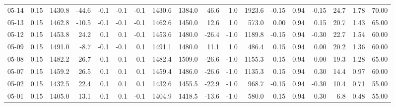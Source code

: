 \begin{threeparttable}
{\begin{tabular}{lrrrrrrrrrrrrrrrrr}
  05-14 &     0.15 & 1430.8 &             -44.6 &              -0.1 &               -0.1 &               -0.1 & 1430.6 & 1384.0 &       46.6 &                      1.0 &              1923.6 &      -0.15 &      0.94 &          -0.15 &             24.7 &            1.78 &                  70.00 \\
  05-13 &     0.15 & 1462.8 &             -10.5 &              -0.1 &               -0.1 &               -0.1 & 1462.6 & 1450.0 &       12.6 &                      1.0 &               573.0 &       0.00 &      0.94 &           0.15 &             20.7 &            1.43 &                  65.00 \\
  05-12 &     0.15 & 1453.8 &              24.2 &               0.1 &                0.1 &               -0.1 & 1453.6 & 1480.0 &      -26.4 &                     -1.0 &              1189.8 &      -0.15 &      0.94 &          -0.30 &             22.7 &            1.54 &                  60.00 \\
  05-09 &     0.15 & 1491.0 &              -8.7 &              -0.1 &               -0.1 &                0.1 & 1491.1 & 1480.0 &       11.1 &                      1.0 &               486.4 &       0.15 &      0.94 &           0.00 &             20.2 &            1.36 &                  60.00 \\
  05-08 &     0.15 & 1482.2 &              26.7 &               0.1 &                0.1 &                0.1 & 1482.4 & 1509.0 &      -26.6 &                     -1.0 &              1155.3 &       0.15 &      0.94 &           0.00 &             19.3 &            1.28 &                  65.00 \\
  05-07 &     0.15 & 1459.2 &              26.5 &               0.1 &                0.1 &                0.1 & 1459.4 & 1486.0 &      -26.6 &                     -1.0 &              1135.3 &       0.15 &      0.94 &           0.30 &             14.4 &            0.97 &                  60.00 \\
  05-02 &     0.15 & 1432.5 &              22.4 &               0.1 &                0.1 &                0.1 & 1432.6 & 1455.5 &      -22.9 &                     -1.0 &               968.7 &      -0.15 &      0.94 &          -0.30 &             10.4 &            0.71 &                  55.00 \\
  05-01 &     0.15 & 1405.0 &              13.1 &               0.1 &                0.1 &               -0.1 & 1404.9 & 1418.5 &      -13.6 &                     -1.0 &               580.0 &       0.15 &      0.94 &           0.30 &              6.8 &            0.48 &                  55.00 \\

\end{tabular}}
\end{threeparttable}

